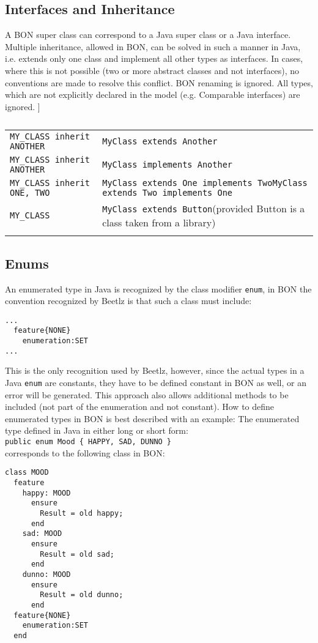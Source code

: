 \documentclass[11pt]{amsart}
\newcommand{\mytablebeg}{\begin{table}[h]\centering\begin{footnotesize}
\begin{tabular}{m{7cm}|m{7cm}} }
\newcommand{\mytableend}[2]{\end{tabular}\end{footnotesize}\caption{#1} \label{#2}\end{table}}
\newcommand{\simpleline}[2]{#1 & #2\\ \hdashline}
\begin{document}
\subsection{Interfaces and Inheritance}\label{inheritance}\hfill \newline
A BON super class can correspond to a Java super class or a Java interface. Multiple inheritance, allowed in BON, can be solved in such a manner in Java, i.e. extends only one class and implement all other types as interfaces. In cases, where this is not possible (two or more abstract classes and not interfaces), no conventions are made to resolve this conflict. BON renaming is ignored. All types, which are not explicitly declared in the model (e.g. Comparable interfaces) are ignored. \newline
[[What's the story with repeated inheritance?]]
\mytablebeg
\simpleline{\texttt{MY\_CLASS inherit ANOTHER}}{\texttt{MyClass extends Another}}
\simpleline{\texttt{MY\_CLASS inherit ANOTHER}}{\texttt{MyClass implements Another}}
\simpleline{\texttt{MY\_CLASS inherit ONE, TWO}}{\texttt{MyClass extends One implements Two}\newline \texttt{MyClass extends Two implements One}}
\simpleline{\texttt{MY\_CLASS}}{\texttt{MyClass extends Button}\newline (provided Button is a class taken from a library)}
\mytableend{}{}

\subsection{Enums}\label{enums}\hfill \newline
An enumerated type in Java is recognized by the class modifier \texttt{enum}, in BON the convention recognized by Beetlz is that such a class must include:
\begin{verbatim}
...
  feature{NONE}
    enumeration:SET
...
\end{verbatim}
This is the only recognition used by Beetlz, however, since the actual types in a Java \texttt{enum} are constants, they have to be defined constant in BON as well, or an error will be generated. This approach also allows additional methods to be included (not part of the enumeration and not constant).
How to define enumerated types in BON is best described with an example:
The enumerated type defined in Java in either long or short form:\\
\texttt{public enum Mood \{ HAPPY, SAD, DUNNO \}}\\
corresponds to the following class in BON:
\begin{verbatim}
class MOOD  
  feature
    happy: MOOD
      ensure
        Result = old happy;
      end
    sad: MOOD
      ensure
        Result = old sad;
      end
    dunno: MOOD
      ensure
        Result = old dunno;
      end
  feature{NONE}
    enumeration:SET
  end
\end{verbatim}
\end{document}
